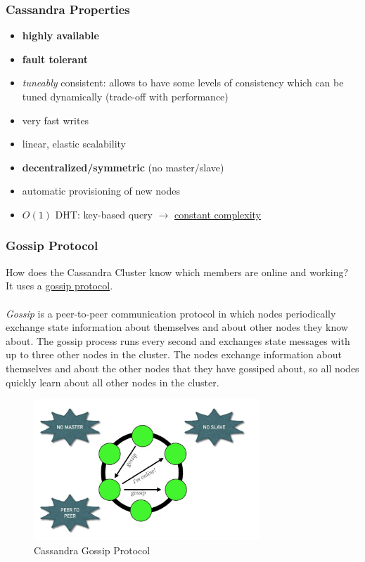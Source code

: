 \documentclass[10pt,a4paper]{article}
\newcommand{\nline}{\\~\\}
\begin{document}
\subsubsection{Cassandra Properties}
\begin{itemize}
	\item \textbf{highly available}
	\item \textbf{fault tolerant}
	\item \textbf{}\textit{tuneably} consistent: allows to have some levels of consistency which can be tuned dynamically (trade-off with performance)
	\item very fast writes
	\item linear, elastic scalability
	\item \textbf{decentralized/symmetric} (no master/slave)
	\item automatic provisioning of new nodes
	\item $O(1)$ DHT: key-based query $\rightarrow$  \uline{constant complexity}
\end{itemize}

\subsubsection{Gossip Protocol}
How does the Cassandra Cluster know which members are online and working? \\ It uses a \href{https://docs.datastax.com/en/cassandra-oss/3.0/cassandra/architecture/archGossipAbout.html}{gossip protocol}. \nline 
\textit{Gossip} is a peer-to-peer communication protocol in which nodes periodically exchange state information about themselves and about other nodes they know about. The gossip process runs every second and exchanges state messages with up to three other nodes in the cluster. The nodes exchange information about themselves and about the other nodes that they have gossiped about, so all nodes quickly learn about all other nodes in the cluster.
\begin{figure}[h!]
 \hfill \includegraphics[width=240pt]{images/gossip-protocol.png}\hspace*{\fill}
 \caption{Cassandra Gossip Protocol}
\end{figure}
\end{document}
